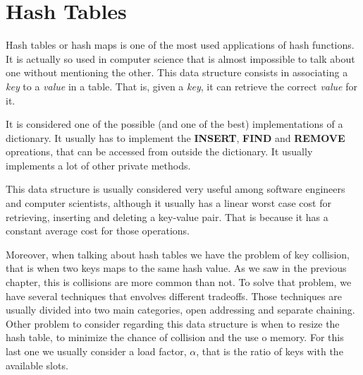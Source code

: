 \chapter{Hash Tables}
\label{cap:Hash Tables}



Hash tables or hash maps is one of the most used applications of hash functions. It is actually so used in computer science that is almost impossible to talk about one without mentioning the other. This data structure consists in associating a \textit{key} to a \textit{value} in a table. That is, given a \textit{key}, it can retrieve the correct \textit{value} for it.

It is considered one of the possible (and one of the best) implementations of a dictionary. It usually has to implement the \textbf{INSERT}, \textbf{FIND} and \textbf{REMOVE} opreations, that can be accessed from outside the dictionary. It usually implements a lot of other private methods. 

This data structure is usually considered very useful among software engineers and computer scientists, although it usually has a linear worst case cost for retrieving, inserting and deleting a key-value pair. That is because it has a constant average cost for those operations.

Moreover, when talking about hash tables we have the problem of key collision, that is when two keys maps to the same hash value. As we saw in the previous chapter, this is collisions are more common than not. To solve that problem, we have several techniques that envolves different tradeoffs. Those techniques are usually divided into two main categories, open addressing and separate chaining. Other problem to consider regarding this data structure is when to resize the hash table, to minimize the chance of collision and the use o memory. For this last one we usually consider a load factor, \( \alpha \), that is the ratio of keys with the available slots.

